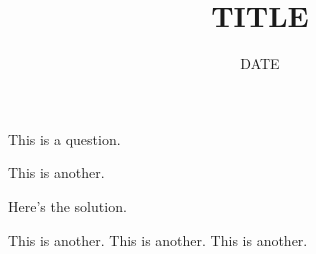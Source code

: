 \documentclass[12pt,letterpaper,answers,initials]{test}
\title{TITLE}
\date{DATE}
\begin{document}
  \begin{questions}
    \question[10] This is a question.
    \newpage

    \question[8] This is another.
      \begin{solutionbox}{3in}
        Here's the solution.
      \end{solutionbox}
    \question[8] This is another.
    \question[8] This is another.
    \question[8] This is another.
  \end{questions}
\end{document}

